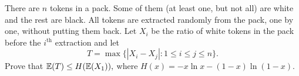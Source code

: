 There are ${n}$ tokens in a pack. Some of them (at least one, but not all) are white and the rest are black. All tokens are extracted randomly from the pack, one by one, without putting them back. Let ${X_i}$ be the ratio of white tokens in the pack before the ${i^{\text{th}}}$ extraction and let
\[ \displaystyle T =\max \{ |X_i-X_j| : 1 \leq i \leq j \leq n\}.\]
Prove that ${\Bbb{E}(T) \leq H(\Bbb{E}(X_1))},$ where ${H(x)=-x\ln x -(1-x)\ln(1-x)}.$

